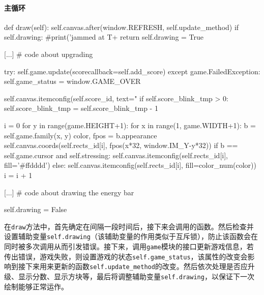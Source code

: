 \documentclass[UTF8]{article}
\begin{document}
\paragraph{主循环}
\begin{python}
    def draw(self):
        self.canvas.after(window.REFRESH, self.update_method)
        if self.drawing:
            #print('jammed at T+%
            return
        self.drawing = True
        
        [...] # code about upgrading
        
        try:
            self.game.update(scorecallback=self.add_score)
        except game.FailedException:
            self.game_status = window.GAME_OVER
            
        self.canvas.itemconfig(self.score_id, text="%
        if self.score_blink_tmp > 0:
            self.score_blink_tmp = self.score_blink_tmp - 1
        
        i = 0
        for y in range(game.HEIGHT+1):
            for x in range(1, game.WIDTH+1):
                b = self.game.family(x, y)
                color, fpos = b.appearance
                self.canvas.coords(self.rects_id[i], fpos(x*32, window.IM_Y-y*32))
                if b == self.game.cursor and self.stressing:
                    self.canvas.itemconfig(self.rects_id[i], fill='#ffdddd')
                else:
                    self.canvas.itemconfig(self.rects_id[i], fill=color_num(color))
                i = i + 1

        [...] # code about drawing the energy bar
        
        self.drawing = False
\end{python}
在\texttt{draw}方法中，首先确定在间隔一段时间后，接下来会调用的函数。然后检查并设置辅助变量\texttt{self.drawing}（该辅助变量的作用类似于互斥锁），防止该函数会在同时被多次调用从而引发错误。接下来，调用\texttt{game}模块的接口更新游戏信息，若传出错误，游戏失败，则设置游戏的状态\verb|self.game_status|，该属性的改变会影响到接下来用来更新的函数\verb|self.update_method|的改变。然后依次处理是否应升级、显示分数、显示方块等，最后将调整辅助变量\texttt{self.drawing}，以保证下一次绘制能够正常运作。
\end{document}
